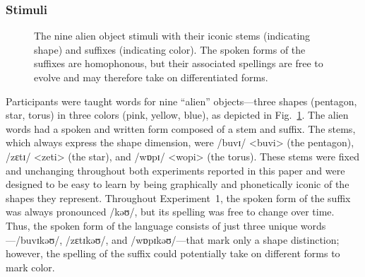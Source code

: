 \documentclass[doc,biblatex]{apa7}
\begin{document}
\subsubsection{Stimuli}

	\begin{figure}
	\vspace*{2pt}
	\caption{The nine alien object stimuli with their iconic stems (indicating shape) and suffixes (indicating color). The spoken forms of the suffixes are homophonous, but their associated spellings are free to evolve and may therefore take on differentiated forms.}
	\label{stimuli}
	\end{figure}

Participants were taught words for nine ``alien'' objects---three shapes (pentagon, star, torus) in three colors (pink, yellow, blue), as depicted in Fig.~\ref{stimuli}. The alien words had a spoken and written form composed of a stem and suffix. The stems, which always express the shape dimension, were /buvɪ/ <buvi> (the pentagon), /zɛtɪ/ <zeti> (the star), and /wɒpɪ/ <wopi> (the torus). These stems were fixed and unchanging throughout both experiments reported in this paper and were designed to be easy to learn by being graphically and phonetically iconic of the shapes they represent. Throughout Experiment~1, the spoken form of the suffix was always pronounced /kəʊ/, but its spelling was free to change over time. Thus, the spoken form of the language consists of just three unique words---/buvɪkəʊ/, /zɛtɪkəʊ/, and /wɒpɪkəʊ/---that mark only a shape distinction; however, the spelling of the suffix could potentially take on different forms to mark color.
\end{document}
